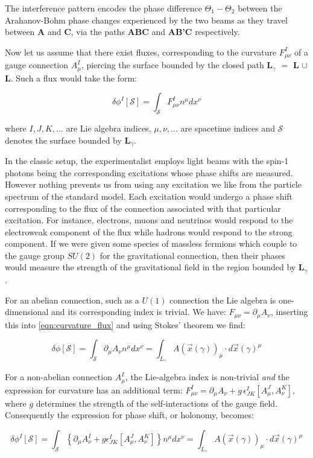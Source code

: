 \begin{doublespace}
The interference pattern encodes the phase difference $ \Theta_1  - \Theta_2 $ between the Arahanov-Bohm phase changes experienced by the two beams as they travel between \textbf{A} and \textbf{C}, via the paths \textbf{ABC} and \textbf{AB'C} respectively.

Now let us assume that there exist fluxes, corresponding to the curvature $ F^I_{\mu\nu} $ of a gauge connection $ A^I_\mu $, piercing the surface bounded by the closed path \textbf{L${}_\gamma$} $ = $ \textbf{L} $ \cup $ \textbf{L}. Such a flux would take the form:

\begin{equation}\label{eqn:curvature_flux}
\delta \phi^I [ \mathcal{S} ] = \int_\mathcal{S} F^I_{\mu\nu} n^\mu dx^\nu 
\end{equation}

where $ I, J, K, \dots $ are Lie algebra indices, $ \mu, \nu, \dots $ are spacetime indices and $ \mathcal{S} $ denotes the surface bounded by \textbf{L${}_\gamma$}.

In the classic setup, the experimentalist employs light beams with the spin-1 photons being the corresponding excitations whose phase shifts are measured. However nothing prevents us from using any excitation we like from the particle spectrum of the standard model. Each excitation would undergo a phase shift corresponding to the flux of the connection associated with that particular excitation. For instance, electrons, muons and neutrinos would respond to the electroweak component of the flux while hadrons would respond to the strong component. If we were given some species of massless fermions which couple to the gauge group $ SU(2) $ for the gravitational connection, then their phases would measure the strength of the gravitational field in the region bounded by \textbf{L${}_\gamma$}.

For an abelian connection, such as a $ U(1) $ connection the Lie algebra is one-dimensional and its corresponding index is trivial. We have: $ F_{\mu\nu} = \partial_\mu A_\nu $, inserting this into \ref{eqn:curvature_flux} and using Stokes' theorem we find:

\begin{equation}\label{eqn:curvature_flux2}
\delta \phi [ \mathcal{S} ] = \int_\mathcal{S} \partial_\mu A_\nu n^\mu dx^\nu = \int_{L_\gamma} A(\vec{x}(\gamma))_\mu \cdot d\vec{x}(\gamma)^\mu
\end{equation}


For a non-abelian connection $ A^I_\mu $, the Lie-algebra index is non-trivial \emph{and} the expression for curvature has an additional term: $ F^I_{\mu\nu} = \partial_\mu A_\nu + g \, \epsilon^I_{JK} [ A^J_\mu, A^K_\nu ] $, where $ g $ determines the strength of the self-interactions of the gauge field. Consequently the expression for phase shift, or holonomy, becomes:

\begin{equation}\label{eqn:curvature_flux3}
\delta \phi^I [ \mathcal{S} ] = \int_\mathcal{S} \left\{ \partial_\mu A^I_\nu  + g \epsilon^I_{JK} [ A^J_\mu, A^K_\nu ] \right \} n^\mu dx^\nu = \int_{L_\gamma} A(\vec{x}(\gamma))_\mu \cdot d\vec{x}(\gamma)^\mu
	\end{equation}

\end{doublespace}




